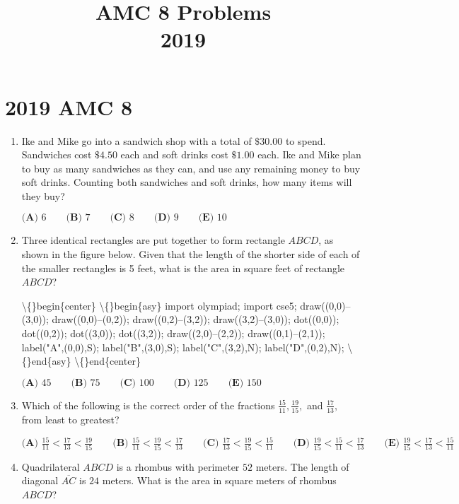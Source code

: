 \documentclass{article}
\title{AMC 8 Problems \\ 2019}
\date{}
\begin{document}
\maketitle\thispagestyle{fancy}\newpage\section*{2019 AMC 8}\begin{enumerate}[label=\arabic*., itemsep=0.5em]\item Ike and Mike go into a sandwich shop with a total of \(\$30.00\) to spend. Sandwiches cost \(\$4.50\) each and soft drinks cost \(\$1.00\) each. Ike and Mike plan to buy as many sandwiches as they can, and use any remaining money to buy soft drinks. Counting both sandwiches and soft drinks, how many items will they buy?

\(\textbf{(A) }6\qquad\textbf{(B) }7\qquad\textbf{(C) }8\qquad\textbf{(D) }9\qquad\textbf{(E) }10\)\par \vspace{0.5em}\item Three identical rectangles are put together to form rectangle \(ABCD\), as shown in the figure below. Given that the length of the shorter side of each of the smaller rectangles is  5 feet, what is the area in square feet of rectangle \(ABCD\)?


\textbackslash\{\}begin\{center\}
\textbackslash\{\}begin\{asy\}
import olympiad;
import cse5;
draw((0,0)--(3,0));
draw((0,0)--(0,2));
draw((0,2)--(3,2));
draw((3,2)--(3,0));
dot((0,0));
dot((0,2));
dot((3,0));
dot((3,2));
draw((2,0)--(2,2));
draw((0,1)--(2,1));
label("A",(0,0),S);
label("B",(3,0),S);
label("C",(3,2),N);
label("D",(0,2),N);
\textbackslash\{\}end\{asy\}
\textbackslash\{\}end\{center\}


\(\textbf{(A) }45\qquad\textbf{(B) }75\qquad\textbf{(C) }100\qquad\textbf{(D) }125\qquad\textbf{(E) }150\)\par \vspace{0.5em}\item Which of the following is the correct order of the fractions \(\frac{15}{11},\frac{19}{15},\) and \(\frac{17}{13},\) from least to greatest?

\(\textbf{(A) }\frac{15}{11}< \frac{17}{13}< \frac{19}{15}  \qquad\textbf{(B) }\frac{15}{11}< \frac{19}{15}<\frac{17}{13}    \qquad\textbf{(C) }\frac{17}{13}<\frac{19}{15}<\frac{15}{11}    \qquad\textbf{(D) } \frac{19}{15}<\frac{15}{11}<\frac{17}{13}   \qquad\textbf{(E) }   \frac{19}{15}<\frac{17}{13}<\frac{15}{11}\)\par \vspace{0.5em}\item Quadrilateral \(ABCD\) is a rhombus with perimeter \(52\) meters. The length of diagonal \(\overline{AC}\) is \(24\) meters. What is the area in square meters of rhombus \(ABCD\)?



\end{enumerate}
\end{document}
